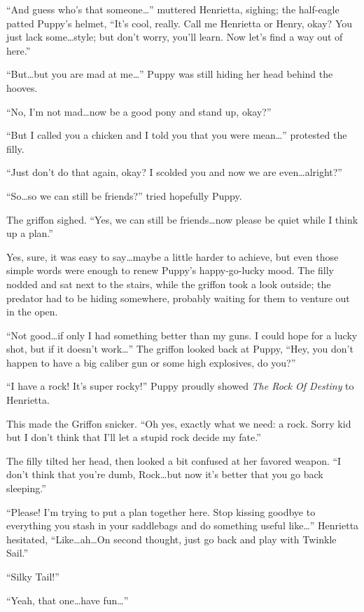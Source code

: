 ``And guess who's that someone\dots'' muttered Henrietta, sighing; the half-eagle patted Puppy's helmet, ``It's cool, really. Call me Henrietta or Henry, okay? You just lack some\dots style; but don't worry, you'll learn. Now let's find a way out of here.''

``But\dots but you are mad at me\dots'' Puppy was still hiding her head behind the hooves.

``No, I'm not mad\dots now be a good pony and stand up, okay?''

``But I called you a chicken and I told you that you were mean\dots'' protested the filly.

``Just don't do that again, okay? I scolded you and now we are even\dots alright?''

``So\dots so we can still be friends?'' tried hopefully Puppy.

The griffon sighed. ``Yes, we can still be friends\dots now please be quiet while I think up a plan.''

Yes, sure, it was easy to say\dots maybe a little harder to achieve, but even those simple words were enough to renew Puppy's happy-go-lucky mood. The filly nodded and sat next to the stairs, while the griffon took a look outside; the predator had to be hiding somewhere, probably waiting for them to venture out in the open.

``Not good\dots if only I had something better than my guns. I could hope for a lucky shot, but if it doesn't work\dots'' The griffon looked back at Puppy, ``Hey, you don't happen to have a big caliber gun or some high explosives, do you?''

``I have a rock! It's super rocky!'' Puppy proudly showed \emph{The Rock Of Destiny} to Henrietta.

This made the Griffon snicker. ``Oh yes, exactly what we need: a rock. Sorry kid but I don't think that I'll let a stupid rock decide my fate.''

The filly tilted her head, then looked a bit confused at her favored weapon. ``I don't think that you're dumb, Rock\dots but now it's better that you go back sleeping.''

``Please! I'm trying to put a plan together here. Stop kissing goodbye to everything you stash in your saddlebags and do something useful like\dots'' Henrietta hesitated, ``Like\dots ah\dots On second thought, just go back and play with Twinkle Sail.''

``Silky Tail!''

``Yeah, that one\dots have fun\dots''

